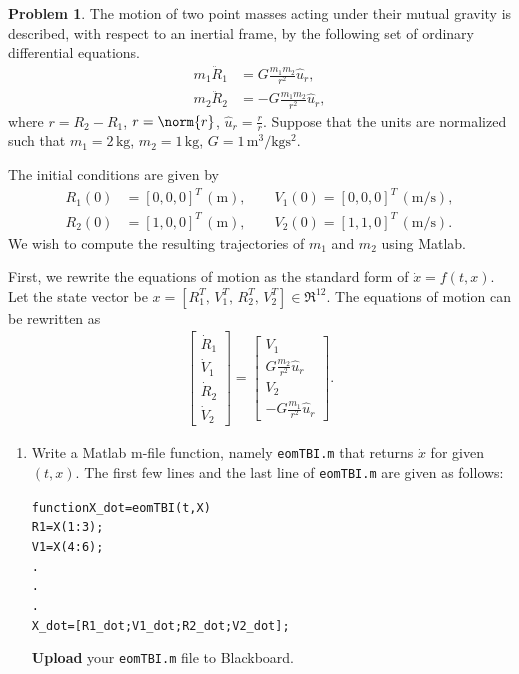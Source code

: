 \documentclass[10pt]{article}
\renewcommand{\baselinestretch}{1.2}
\theoremstyle{definition}
\newtheorem{prob}{Problem}[section]
\newenvironment{subprob}%
{\renewcommand{\theenumi}{\alph{enumi}}\renewcommand{\labelenumi}{(\theenumi)}\begin{enumerate}}%
{\end{enumerate}}%
\newenvironment{matlab}
{\begin{alltt}\small\renewcommand{\baselinestretch}{1.2}\selectfont}%
{\end{alltt}}
\begin{document}
\begin{prob}
The motion of two point masses acting under their mutual gravity is described, with respect to an inertial frame, by the following set of ordinary differential equations.
\begin{align}
m_1\ddot{{R}}_1 & = G \frac{m_1 m_2}{r^2} \hat u_r,\\
m_2\ddot{{R}}_2 & = -G \frac{m_1 m_2}{r^2} \hat u_r,
\end{align}
where $ r= R_2 - R_1$, $r=\norm{ r}$, $\hat u_r = \frac{ r}{r}$. Suppose that the units are normalized such that $m_1=2\,\mathrm{kg}$, $m_2=1\,\mathrm{kg}$, $G=1\,\mathrm{m^3/kg s^2}$.

The initial conditions are given by
\begin{align*}
 R_1(0)&=[0,0,0]^T\,(\mathrm{m}), \qquad  V_1(0)=[0,0,0]^T\,(\mathrm{m/s}),\\
 R_2(0)&=[1,0,0]^T\,(\mathrm{m}), \qquad  V_2(0)=[1,1,0]^T\,(\mathrm{m/s}).
\end{align*}
We wish to compute the resulting trajectories of $m_1$ and $m_2$ using Matlab. 


First, we rewrite the equations of motion as the standard form of $\dot x = f(t,x)$. Let the state vector be $x=[R_1^T,\,V_1^T,\, R_2^T,\, V_2^T]\in\Re^{12}$. The equations of motion can be rewritten as
\begin{align}
\begin{bmatrix} \dot R_1 \\ \dot V_1 \\ \dot R_2 \\ \dot V_2\end{bmatrix}
=
\begin{bmatrix}
V_1 \\
G\frac{m_2}{r^2} \hat u_r\\
V_2 \\
-G\frac{m_1}{r^2} \hat u_r
\end{bmatrix}.
\end{align}


\begin{subprob}

\item Write a Matlab m-file function, namely \texttt{eomTBI.m} that returns $\dot x$ for given $(t,x)$. The first few lines and the last line of \texttt{eomTBI.m} are given as follows:
\begin{matlab}
function X_dot = eomTBI(t,X)
R1=X(1:3);
V1=X(4:6);
.
.
.
X_dot = [R1_dot; V1_dot; R2_dot; V2_dot];
\end{matlab}
\textbf{Upload} your \texttt{eomTBI.m} file to Blackboard.


\end{subprob}
\end{prob}
\end{document}
